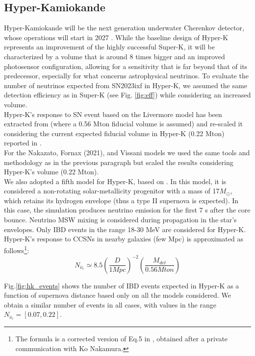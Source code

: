 \documentclass[twocolumn]{aastex631}
\newcommand{\Mo}{M_{\odot}}
\begin{document}
\subsection{Hyper-Kamiokande}

Hyper-Kamiokande will be the next generation underwater Cherenkov detector, whose operations will start in 2027 \citep{art:HK}. While the baseline design of Hyper-K represents an improvement of the highly successful Super-K, it will be characterized by a volume that is around 8 times bigger and an improved photosensor configuration, allowing for a sensitivity that is far beyond that of its predecessor, especially for what concerns astrophysical neutrinos. 
 To evaluate the number of neutrinos expected from SN2023ixf in Hyper-K, we assumed the same detection efficiency as in Super-K (see Fig. \ref{fig:eff}) while considering an increased volume. \\
Hyper-K's response to SN event based on the Livermore model has been extracted from \cite{art:HK} (where a 0.56 Mton fiducial volume is assumed) and re-scaled it considering the current expected fiducial volume in Hyper-K (0.22 Mton) reported in \cite{art:HK_sn}. \\
For the Nakazato, Fornax (2021), and Vissani models we used the same tools and methodology as in the previous paragraph but scaled the results considering Hyper-K's volume (0.22 Mton). \\
We also adopted a fifth model for Hyper-K, based on \cite{nakamura}. In this model, it is considered a non-rotating solar-metallicity progenitor with a mass of 17$\Mo$, which retains its hydrogen envelope (thus a type II supernova is expected). In this case, the simulation produces neutrino emission for the first 7 s after the core bounce. Neutrino MSW mixing is considered during propagation in the star's envelopes. Only IBD events in the range 18-30 MeV are considered for Hyper-K. \\Hyper-K's response to CCSNs in nearby galaxies (few Mpc) is approximated as follows\footnote{The formula is a corrected version of Eq.5 in \cite{nakamura}, obtained after a private communication with Ko Nakamura.}: 
\begin{equation}
    N_{\bar{\nu}_e}\simeq8.5\left(\dfrac{D}{1Mpc}\right)^{-2}\left(\dfrac{M_{det}}{0.56Mton}\right)
\end{equation}

Fig.\ref{fig:hk_events} shows the number of IBD events expected in Hyper-K as a function of supernova distance based only on all the models considered. We obtain  a similar number of events in all cases, with values in the range $N_{\bar{\nu}_e}=[0.07, 0.22]$. 
\end{document}
